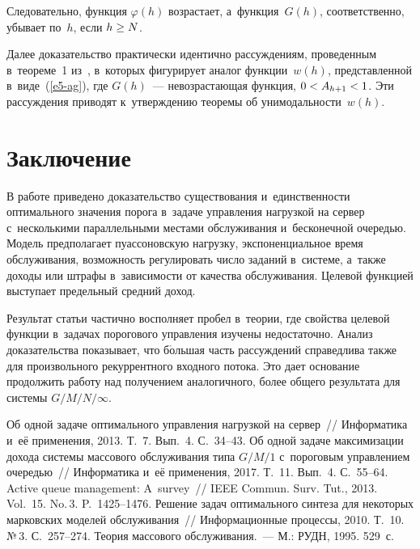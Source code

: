 \begin{multicols}{2}
  Следовательно, функция $\varphi(h)$ возрастает, а~функ\-ция~$G(h)$, 
соответственно, убывает по~$h$, если $h\hm\geq N$.
  
Далее доказательство практически идентично рассуждениям, проведенным 
в~теореме~1 из~\cite{2-ag}, в~которых фигурирует аналог функции~$w(h)$, 
представленной в~виде~(\ref{e5-ag}), где $G(h)$~--- невозрастающая функция, 
$0\hm< A_{h+1}\hm<1$. Эти рассуждения приводят к~утверждению теоремы об 
унимодальности~$w(h)$. 


  \section{Заключение}
  
  В работе приведено доказательство существования и~единственности 
оптимального значения порога в~задаче управления нагрузкой на сервер 
с~несколькими параллельными местами обслуживания и~бесконечной 
очередью. Модель предполагает пуассоновскую нагрузку, экспоненциальное 
время обслуживания, возможность регулировать чис\-ло заданий в~системе, 
а~также доходы или штрафы в~зависимости от качества обслуживания. Целевой 
функцией выступает предельный средний доход.
  
  Результат статьи частично восполняет пробел в~теории, где свойства целевой 
функции в~задачах порогового управления изучены недостаточно. Анализ 
доказательства показывает, что б$\acute{\mbox{о}}$льшая часть рассуждений справедлива также 
для произвольного рекуррентного входного потока. Это дает основание 
продолжить работу над получением аналогичного, более общего результата для 
системы $G/M/N/\infty$.
  
 {\small\frenchspacing
 {%
 \begin{thebibliography}{9}
   Об одной задаче оптимального управ\-ле\-ния нагрузкой 
на сервер~// Информатика и~её применения, 2013. Т.~7. Вып.~4. С.~34--43.
   Об одной задаче максимизации дохода 
системы массового обслуживания типа $G/M/1$ с~пороговым управ\-ле\-ни\-ем очередью~// Информатика и~её 
применения, 2017. Т.~11. Вып.~4. С.~55--64.
   Active queue management: A~survey~// IEEE Commun. 
Surv. Tut., 2013. Vol.~15. No.\,3. P.~1425--1476.
   Решение задач оптимального синтеза для некоторых 
марковских моделей обслуживания~// Информационные процессы, 2010. Т.~10. 
№\,3. С.~257--274.
   Теория массового обслуживания.~--- 
М.: РУДН, 1995. 529~с.
 \end{thebibliography}

 }
 }

\end{multicols}

